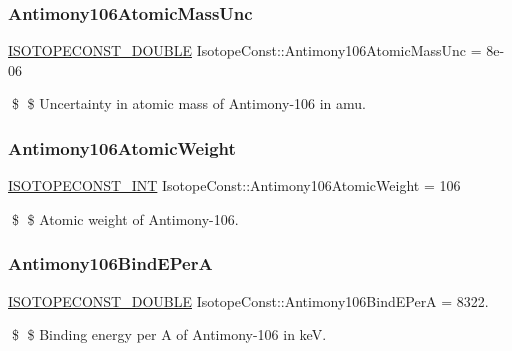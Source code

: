 \subsubsection{\texorpdfstring{Antimony106\+Atomic\+Mass\+Unc}{Antimony106AtomicMassUnc}}
{\footnotesize\ttfamily \mbox{\hyperlink{group___isotope_const-_macros_ga8f45a7272ce02c0b4c65c44636ed719a}{I\+S\+O\+T\+O\+P\+E\+C\+O\+N\+S\+T\+\_\+\+D\+O\+U\+B\+LE}} Isotope\+Const\+::\+Antimony106\+Atomic\+Mass\+Unc = 8e-\/06}

\$ \$ Uncertainty in atomic mass of Antimony-\/106 in amu. \mbox{\label{group___isotope_const-_antimony-_sb106_gadab24bcf1d74dde9eb0d8c7fe0b52dea}} 
\subsubsection{\texorpdfstring{Antimony106\+Atomic\+Weight}{Antimony106AtomicWeight}}
{\footnotesize\ttfamily \mbox{\hyperlink{group___isotope_const-_macros_ga5f18360b3e99483a35c32d789e62621c}{I\+S\+O\+T\+O\+P\+E\+C\+O\+N\+S\+T\+\_\+\+I\+NT}} Isotope\+Const\+::\+Antimony106\+Atomic\+Weight = 106}

\$ \$ Atomic weight of Antimony-\/106. \mbox{\label{group___isotope_const-_antimony-_sb106_gaa5c5102cb5f62c7b71998256903fbbe7}} 
\subsubsection{\texorpdfstring{Antimony106\+Bind\+E\+PerA}{Antimony106BindEPerA}}
{\footnotesize\ttfamily \mbox{\hyperlink{group___isotope_const-_macros_ga8f45a7272ce02c0b4c65c44636ed719a}{I\+S\+O\+T\+O\+P\+E\+C\+O\+N\+S\+T\+\_\+\+D\+O\+U\+B\+LE}} Isotope\+Const\+::\+Antimony106\+Bind\+E\+PerA = 8322.}

\$ \$ Binding energy per A of Antimony-\/106 in keV. \mbox{\label{group___isotope_const-_antimony-_sb106_ga5c26e4dee167e66080eda870c72a8a3f}} 
